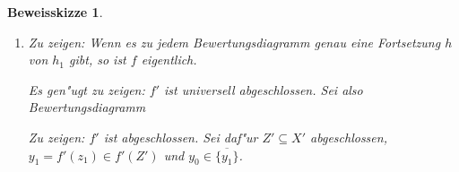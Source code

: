 \documentclass[paper = A4, fontsize=12pt, numbers=noendperiod, chapterprefix=true]{scrbook}
\theoremstyle{break}
\theoremstyle{nonumberbreak}
\newtheorem{bewskiz}{Beweisskizze}
\theoremstyle{nonumberplain}
\newcommand{\quot}[1]{\textrm{\glqq}{#1}\textrm{\grqq}}
\newenvironment{twosidedproof}{\begin{enumerate}[\quot{$\Rightarrow$}:]}{\end{enumerate}}
\newcommand{\proofreverse}{\item[\quot{$\Leftarrow$}:]}
\DeclareMathOperator{\pr}{pr}
\newcommand{\calO}{\mathcal{O}}
\newcommand{\X}{\times}
\begin{document}
\begin{bewskiz}
\begin{enumerate}[I)]
\begin{twosidedproof}
		Sei $\varphi: U \to X \X_Y T$ der von $h_0$ und $i$ induzierte Morphismus
			\begin{center}\end{center}
		Da $i = f' \circ \varphi$ ist und $i$ dominant, ist auch $f'$ dominant $\xRightarrow{f' \text{ abg.}} f'$ surjektiv
		
		Sei $z_1 = \varphi(t_1) \in X \X_Y T$, also $f'(z_1) = t_1$ (generischer Punkt), $Z:= \overline{\{z_1\}}$ mit reduzierter Struktur.
		
		Auch $f'|_Z$ ist surjektiv, also gibt es $z_0 \in Z$ mit $f'(z_0) = t_0$. $f'$ induziert lokalen Ringhomomorphismus $R = \calO_{T,t_0} \to \calO_{Z, z_0}$ und Einbettung $K = \kappa(t_1) \hookrightarrow \kappa(z_1)$. $\varphi$ induziert $\kappa(z_1) \hookrightarrow \kappa(t_1) = K$, also $\kappa(z_1) \cong K$.
		
		$\xRightarrow{\text{Prop. \ref{8.8}}} R \cong \calO_{Z, z_0} \xRightarrow{\text{\S 3 Bsp.2}} \exists\ h: t \to X$ mit $h(t_i) = \pr_X(z_i)$, $i= 0,1$
	\proofreverse
		Zu zeigen: Wenn es zu jedem Bewertungsdiagramm genau eine Fortsetzung $h$ von $h_1$ gibt, so ist $f$ eigentlich.
		
		Es gen"ugt zu zeigen: $f'$ ist universell abgeschlossen. Sei also Bewertungsdiagramm
			\begin{center}\end{center}
		\emph{Zu zeigen:} $f'$ ist abgeschlossen. Sei daf"ur $Z' \subseteq X'$ abgeschlossen, $y_1 = f'(z_1) \in f'(Z')$ und $y_0 \in \overline{\{y_1\}}$.
		

\end{twosidedproof}
\end{enumerate}
\end{bewskiz}
\end{document}
